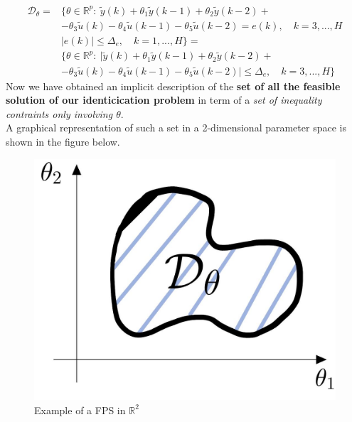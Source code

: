 \begin{equation*} 
    \begin{aligned}
        \mathcal{D}_\theta=&\{\theta\in\mathbb{R}^p: \ 
                \tilde{y}(k)+\theta_1\tilde{y}(k-1)
                +\theta_2\tilde{y}(k-2)+\\
                &-\theta_3\tilde{u}(k)
                -\theta_4\tilde{u}(k-1)
                -\theta_5\tilde{u}(k-2)=e(k), \quad k=3,...,H\\
                &  \vert e(k) \vert \le \Delta_e, \quad k=1,...,H
        \}= \\
        &\{\theta\in\mathbb{R}^p: \ 
                \vert \tilde{y}(k)+\theta_1\tilde{y}(k-1)
                +\theta_2\tilde{y}(k-2)+\\
                &-\theta_3\tilde{u}(k)
                -\theta_4\tilde{u}(k-1)
                -\theta_5\tilde{u}(k-2) \vert \le \Delta_e, \quad k=3,...,H
        \}
    \end{aligned}
\end{equation*}
Now we have obtained an implicit description of the \textbf{set of all the feasible solution of our identicication problem} in term of a \textit{set of inequality contraints only involving $\theta$}.\\
A graphical representation of such a set in a 2-dimensional parameter space is shown in the figure below.

\begin{figure}
    \centering
    \includegraphics[scale=0.18]{img/FPS_1.jpeg}
    \vspace{-0.3em}
    \caption{Example of a FPS in $\mathbb{R}^2$}
\end{figure}

